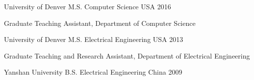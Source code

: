 

\begin{cventries}
\cventryeducation
{University of Denver} %
{M.S. Computer Science} %
{USA} %
{2016} %
{ %
\begin{cvitems}
\item {Graduate Teaching Assistant, Department of Computer Science}
\end{cvitems}
}

\cventryeducation
{University of Denver} %
{M.S. Electrical Engineering} %
{USA} %
{2013} %
{ %
\begin{cvitems}
\item {Graduate Teaching and Research Assistant, Department of Electrical Engineering}
\end{cvitems}
}

\cventryeducation
{Yanshan University} %
{B.S. Electrical Engineering} %
{China} %
{2009} %
{}

\end{cventries}
